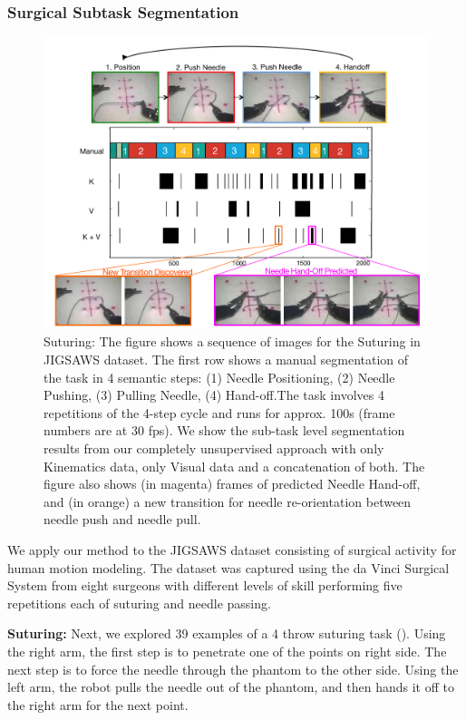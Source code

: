 
\subsubsection{Surgical Subtask Segmentation}

\begin{figure}[t!]
    \centering
    \includegraphics[width=0.8\linewidth]{figures/suturing}
	\caption{Suturing: The figure shows a sequence of images for the Suturing in JIGSAWS dataset\cite{gao2014jigsaws}.
The first row shows a manual segmentation of the task in 4 semantic steps: (1) Needle Positioning, (2) Needle Pushing, (3) Pulling Needle, (4) Hand-off.The task involves 4 repetitions of the 4-step cycle and runs for approx. 100s (frame numbers are at 30 fps). We show the sub-task level segmentation results from our completely unsupervised approach with only Kinematics data, only Visual data and a concatenation of both. The figure also shows (in magenta) frames of predicted Needle Hand-off, and (in orange) a new transition for needle re-orientation between needle push and needle pull.
}
	\label{fig:suturing}
	\vspace{-5pt}
\end{figure}

We apply our method to the JIGSAWS dataset\cite{gao2014jigsaws} consisting of surgical activity for human motion modeling. The dataset was captured using the da Vinci Surgical System from eight surgeons with different levels of skill performing five repetitions each of suturing and needle passing.

\vspace{0.5em}
\noindent\textbf{Suturing: }Next, we explored 39 examples of a 4 throw suturing task (). Using the right arm, the first step is to penetrate one of the points on right side. The next step is to force the needle through the phantom to the other side. Using the left arm, the robot pulls the needle out of the phantom, and then hands it off to the right arm for the next point. 


